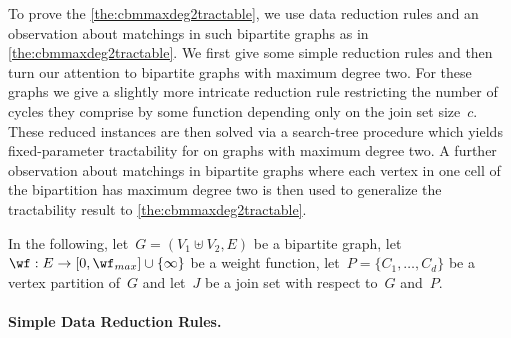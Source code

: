 To prove the \autoref{the:cbmmaxdeg2tractable}, we use data reduction rules and an observation about matchings in such bipartite graphs as in \autoref{the:cbmmaxdeg2tractable}. We first give some simple reduction rules and then turn our attention to bipartite graphs with maximum degree two. For these graphs we give a slightly more intricate reduction rule restricting the number of cycles they comprise by some function depending only on the join set size~$c$. These reduced instances are then solved via a search-tree procedure which yields fixed-parameter tractability for \pCBMs{} on graphs with maximum degree two. A further observation about matchings in bipartite graphs where each vertex in one cell of the bipartition has maximum degree two is then used to generalize the tractability result to \autoref{the:cbmmaxdeg2tractable}.

In the following, let~$G = (V_1 \uplus V_2, E)$ be a bipartite graph, let~$\wf:E \rightarrow [0, \wf_{max}]\cup \{\infty\}$ be a weight function, let~$P = \{C_1, \ldots, C_d\}$ be a vertex partition of~$G$ and let~$J$ be a join set with respect to~$G$ and~$P$.

\paragraph{Simple Data Reduction Rules.}

